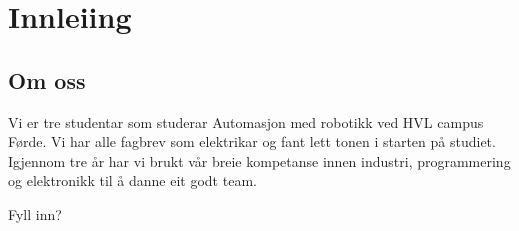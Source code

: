 \chapter{Innleiing}
\thispagestyle{fancy}

\section{Om oss}

Vi er tre studentar som studerar Automasjon med robotikk ved HVL campus Førde.
Vi har alle fagbrev som elektrikar og fant lett tonen i starten på studiet.
Igjennom tre år har vi brukt vår breie kompetanse innen industri, programmering og elektronikk
til å danne eit godt team.

Fyll inn?


